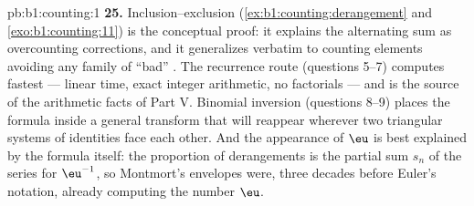 \begin{solution}{pb:b1:counting:1}
\textbf{25.} Inclusion--exclusion
(\cref{ex:b1:counting:derangement} and \cref{exo:b1:counting:11})
is the conceptual proof: it explains the alternating sum as
overcounting corrections, and it generalizes verbatim to counting
elements avoiding any family of ``bad'' . The recurrence route
(questions 5--7) computes fastest --- linear time, exact integer
arithmetic, no factorials --- and is the source of the arithmetic
facts of Part V. Binomial inversion (questions 8--9) places the
formula inside a general transform that will reappear wherever
two triangular systems of identities face each other. And the
appearance of $\eu$ is best explained by the formula itself: the
proportion of derangements is the partial sum $s_n$ of the series
for $\eu^{-1}$, so Montmort's envelopes were, three decades before
Euler's notation, already computing the number $\eu$.
\end{solution}
